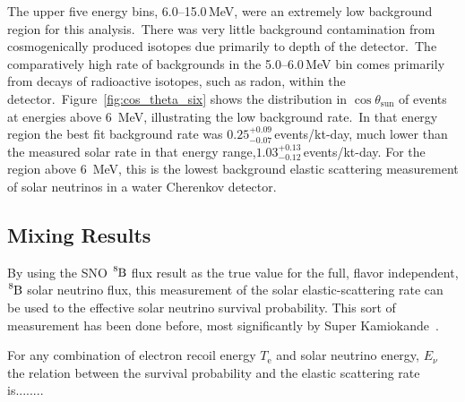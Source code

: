 The upper five energy bins, \numrange[range-phrase=--]{6.0}{15.0}\,MeV, were an
extremely low background region for this analysis.\
There was very little background contamination from
cosmogenically produced isotopes due primarily to depth of the detector.\
The comparatively high rate of backgrounds in the \numrange[range-phrase=--]{5.0}{6.0}\,MeV bin
comes primarily from decays of radioactive isotopes, such as radon, within the detector.\
Figure~\ref{fig:cos_theta_six} shows the distribution in $\cos\theta_\text{{sun}}$ of events at
energies above 6~MeV, illustrating the low background rate.\
In that energy region the best fit background rate was $0.25^{+0.09}_{-0.07}$\,events/kt-day, much
lower than the measured solar rate in that energy range,$1.03^{+0.13}_{-0.12}$\,events/kt-day.
For the region above 6~MeV, this is the lowest
background elastic scattering measurement of solar neutrinos in a water
Cherenkov detector.\

\subsection{Mixing Results}
By using the SNO $\ce{^{8}B}$ flux result as the true value for the full,
flavor independent, $\ce{^{8}B}$ solar neutrino flux, this measurement of the
solar elastic-scattering rate can be used to the effective solar neutrino survival
probability.
This sort of measurement has been done before, most significantly by
Super Kamiokande~\citep{superk1,superk2,superk3,superk4}.

For any combination of electron recoil energy $T_{\mathrm{e}}$ and solar
neutrino energy, $E_{\nu}$ the relation between the survival probability
and the elastic scattering rate is........
